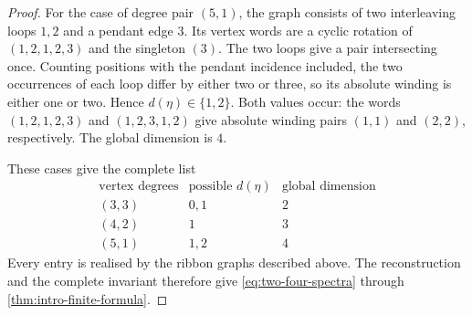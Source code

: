 \documentclass[11pt]{amsart}
\theoremstyle{definition}
\theoremstyle{plain}
\theoremstyle{definition}
\theoremstyle{definition}
\begin{document}
\begin{proof}
For the case of degree pair $(5,1)$, the graph consists of two interleaving loops $1,2$ and a pendant
edge $3$.  Its vertex words are a cyclic rotation of
$(1,2,1,2,3)$ and the singleton $(3)$.
The two loops give a pair intersecting once.  Counting positions
with the pendant incidence included, the two occurrences of
each loop differ by either two or three, so its absolute winding
is either one or two.  Hence $d(\eta)\in\{1,2\}$.
Both values occur: the words $(1,2,1,2,3)$ and $(1,2,3,1,2)$
give absolute winding pairs $(1,1)$ and $(2,2)$, respectively.
The global dimension is $4$.

These cases give the complete list
\begin{equation}
\label{eq:two-four-degree-filter}
\begin{array}{c|c|c}
  \text{vertex degrees}
  &\text{possible }d(\eta)
  &\text{global dimension}\\ \hline
  (3,3)&0,1&2\\
  (4,2)&1&3\\
  (5,1)&1,2&4
\end{array}
\end{equation}
Every entry is realised by the ribbon graphs described above.
The reconstruction and the complete invariant therefore give
\eqref{eq:two-four-spectra} through
\cref{thm:intro-finite-formula}.
\end{proof}
\end{document}
